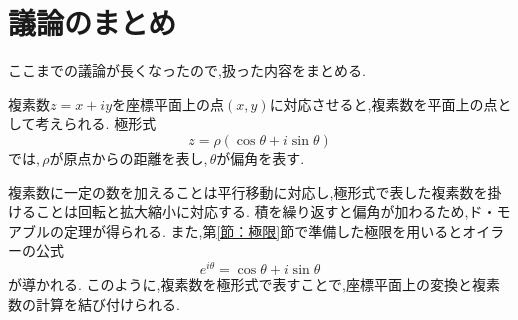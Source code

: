 
\section{議論のまとめ}\label{節：議論のまとめ}
  ここまでの議論が長くなったので,扱った内容をまとめる.

  複素数$z=x+iy$を座標平面上の点$(x,y)$に対応させると,複素数を平面上の点として考えられる.
  極形式
  \[
    z=\rho(\cos\theta+i\sin\theta)
  \]
  では,\,$\rho$が原点からの距離を表し,\,$\theta$が偏角を表す.

  複素数に一定の数を加えることは平行移動に対応し,極形式で表した複素数を掛けることは回転と拡大縮小に対応する.
  積を繰り返すと偏角が加わるため,ド・モアブルの定理が得られる.
  また,第\ref{節：極限}節で準備した極限を用いるとオイラーの公式
  \[
    e^{i\theta}=\cos\theta+i\sin\theta
  \]
  が導かれる.
  このように,複素数を極形式で表すことで,座標平面上の変換と複素数の計算を結び付けられる.
